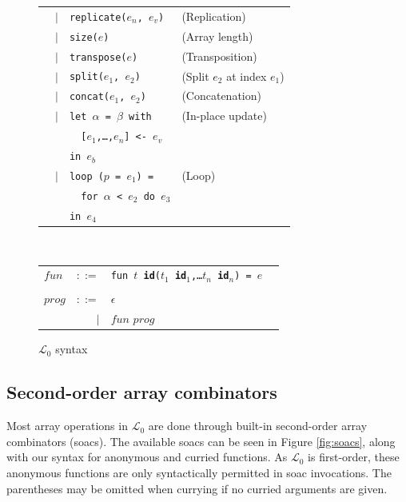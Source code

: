 \documentclass{sigplanconf}  %
\newcommand{\LO}{$\mathcal{L}_0$}
\begin{document}
\begin{figure}[bt]
\begin{tabular}{lrll}
& $|$ & {\tt replicate($e_{n}$, $e_{v}$)} & (Replication) \\
& $|$ & {\tt size($e$)} & (Array length) \\
& $|$ & {\tt transpose($e$)} & (Transposition) \\
& $|$ & {\tt split($e_{1}$, $e_{2}$)} & (Split $e_{2}$ at index $e_{1}$) \\
& $|$ & {\tt concat($e_{1}$, $e_{2}$)} & (Concatenation) \\
& $|$ & {\tt let $\alpha$ = $\beta$ with} & (In-place update) \\
&     & {\tt \ \ [$e_{1}$,\ldots,$e_{n}$] <- $e_{v}$} \\
&     & {\tt in $e_{b}$} \\
& $|$ & {\tt loop ($p$ = $e_{1}$) =} & (Loop) \\
&     & {\tt \ \ for $\alpha$ < $e_{2}$ do $e_{3}$} \\
&     & {\tt in $e_{4}$} \\
\end{tabular}
\\
\begin{tabular}{lrll}
$fun$ & $::=$ & {\tt fun $t$ {\bf id}($t_{1}$ {\bf id}$_{1}$,\ldots $t_{n}$ {\bf id}$_{n}$) = $e$} \\
\\
$prog$ & $::=$ & $\epsilon$ \\
       & $|$   & $fun$ $prog$
\end{tabular}
\caption{\LO{} syntax}
\label{fig:fo-syntax}
\end{figure}

\subsection{Second-order array combinators}
\label{sec:soacs}

Most array operations in \LO{} are done through built-in second-order
array combinators ({\sc soac}s).  The available {\sc soac}s can be seen in Figure
\ref{fig:soacs}, along with our syntax for anonymous and curried
functions.  As \LO{} is first-order, these anonymous functions are
only syntactically permitted in {\sc soac} invocations.  The parentheses may
be omitted when currying if no curried arguments are given.
\end{document}
